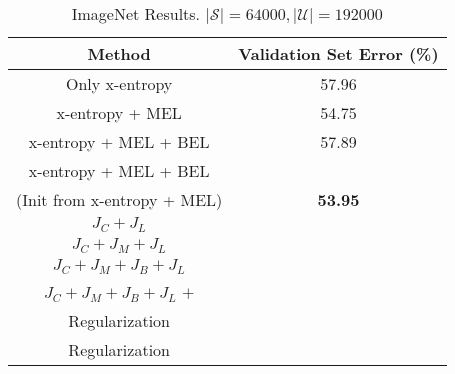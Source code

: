 \begin{table}
		\centering
		\resizebox{0.5\textwidth}{!}
		{
		\begin{tabular}{|c|c|}
			\hline
			\textbf{Method} & \textbf{Validation Set Error (\%)}\\
			\hline
			Only x-entropy & 57.96\\
			\hline
			x-entropy + MEL & 54.75\\
			\hline
			x-entropy + MEL + BEL & 57.89\\
			\hline
			x-entropy + MEL + BEL & \\
			(Init from x-entropy + MEL) & \textbf{53.95}\\
			\hline
			$J_C + J_L$  & \\
			\hline
			$J_C + J_M + J_L$  & \\
			\hline
			$J_C + J_M + J_B + J_L$  & \\
			\hline
			$J_C + J_M + J_B + J_L$ $+$  & \\
			Regularization & \\
			\hline
			\hline
			Regularization \cite{Sajjadi2016a} & \\
			\hline
		\end{tabular}
		}
		\caption{ImageNet Results. $|\mathcal{S}| = 64000, |\mathcal{U}| = 192000$}
		\label{tab:imagenet_results}
\end{table}


